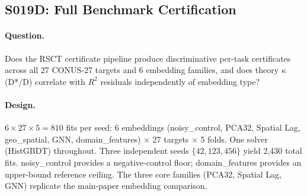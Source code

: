 \documentclass{article}
\begin{document}
\subsection{S019D: Full Benchmark Certification}
\label{app:s019d}

\paragraph{Question.} Does the RSCT certificate pipeline produce discriminative per-task certificates across all 27 CONUS-27 targets and 6 embedding families, and does theory $\kappa$ (D*/D) correlate with $R^2$ residuals independently of embedding type?

\paragraph{Design.} $6 \times 27 \times 5 = 810$ fits per seed: 6 embeddings (noisy\_control, PCA32, Spatial Lag, geo\_spatial, GNN, domain\_features) $\times$ 27 targets $\times$ 5 folds. One solver (HistGBDT) throughout. Three independent seeds $\{42, 123, 456\}$ yield 2{,}430 total fits. noisy\_control provides a negative-control floor; domain\_features provides an upper-bound reference ceiling. The three core families (PCA32, Spatial Lag, GNN) replicate the main-paper embedding comparison.
\end{document}

